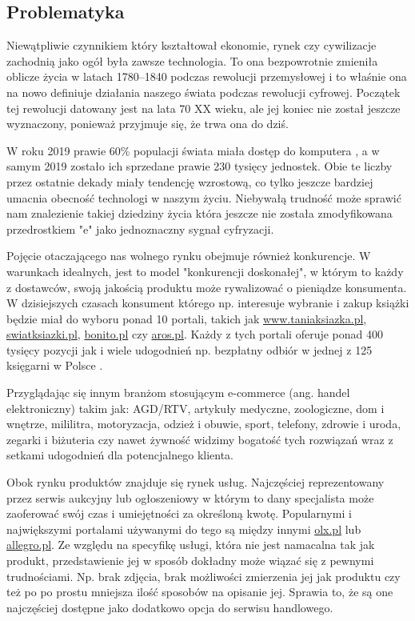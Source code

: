 \documentclass[12pt]{article}
\numberwithin{figure}{section}
\begin{document}
\begin{sloppypar}
\subsection{Problematyka} \label{sec:problematyka}
Niewątpliwie czynnikiem który kształtował ekonomie, rynek czy cywilizacje zachodnią jako ogół była zawsze technologia. To ona bezpowrotnie zmieniła oblicze życia w latach 1780–1840 podczas rewolucji przemysłowej i to właśnie ona na nowo definiuje działania naszego świata podczas rewolucji cyfrowej. Początek tej rewolucji datowany jest na lata 70 XX wieku, ale jej koniec nie został jeszcze wyznaczony, ponieważ przyjmuje się, że trwa ona do dziś.

W roku 2019 prawie 60\% populacji świata miała dostęp do komputera \cite{internet-users}, a w samym 2019 zostało ich sprzedane prawie 230 tysięcy jednostek\cite{computers}. Obie te liczby przez ostatnie dekady miały tendencję wzrostową, co tylko jeszcze bardziej umacnia obecność technologi w naszym życiu. Niebywałą trudność może sprawić nam znalezienie takiej dziedziny życia która jeszcze nie została zmodyfikowana przedrostkiem "e" jako jednoznaczny sygnał cyfryzacji.

Pojęcie otaczającego nas wolnego rynku obejmuje również konkurencje. W warunkach idealnych, jest to model "konkurencji doskonałej", w którym to każdy z dostawców, swoją jakością produktu może rywalizować o pieniądze konsumenta. W dzisiejszych czasach konsument którego np. interesuje wybranie i zakup książki będzie miał do wyboru ponad 10 portali, takich jak \url{www.taniaksiazka.pl}, \url{swiatksiazki.pl}, \url{bonito.pl} czy \url{aros.pl}. Każdy z tych portali oferuje ponad 400 tysięcy pozycji jak i wiele udogodnień np. bezpłatny odbiór w jednej z 125 księgarni w Polsce \cite{ranking}. 

Przyglądając się innym branżom stosującym e-commerce (ang. handel elektroniczny) takim jak: AGD/RTV, artykuły medyczne, zoologiczne, dom i wnętrze, mililitra, motoryzacja, odzież i obuwie, sport, telefony, zdrowie i uroda, zegarki i biżuteria czy nawet żywność widzimy bogatość tych rozwiązań wraz z setkami udogodnień dla potencjalnego klienta. 

Obok rynku produktów znajduje się rynek usług. Najczęściej reprezentowany przez serwis aukcyjny lub ogłoszeniowy w którym to dany specjalista może zaoferować swój czas i umiejętności za określoną kwotę. Popularnymi i największymi portalami używanymi do tego są między innymi \url{olx.pl} lub \url{allegro.pl}.
Ze względu na specyfikę usługi, która nie jest namacalna tak jak produkt, przedstawienie jej w sposób dokładny może wiązać się z pewnymi trudnościami. Np. brak zdjęcia, brak możliwości zmierzenia jej jak produktu czy też po po prostu mniejsza ilość sposobów na opisanie jej. Sprawia to, że są one najczęściej dostępne jako dodatkowo opcja do serwisu handlowego. 


\end{sloppypar}
\end{document}
